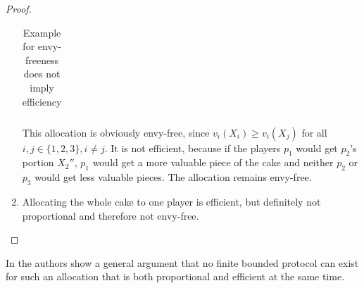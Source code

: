 \begin{proof}
\begin{enumerate}
\begin{table}[htb]
\begin{tabular}{c|ccc}
 		\end{tabular}	 
\caption{Example for envy-freeness does not imply efficiency}\label{Table3}
\end{table}
\newline This allocation is obviously envy-free, since $v_i(X_i) \geq v_i(X_j)$ for all $i, j \in \{1,2,3\}, i \neq j$. It is not efficient, because if the players $p_1$ would get $p_2$'s portion $X_2''$, $p_1$ would get a more valuable piece of the cake and neither $p_2$ or $p_3$ would get less valuable pieces. The allocation remains envy-free.
		\item Allocating the whole cake to one player is efficient, but definitely not proportional and therefore not envy-free.
	\end{enumerate}
\end{proof}
In \cite{brams2} the authors show a general argument that no finite bounded protocol can exist for such an allocation that is both proportional and efficient at the same time.
